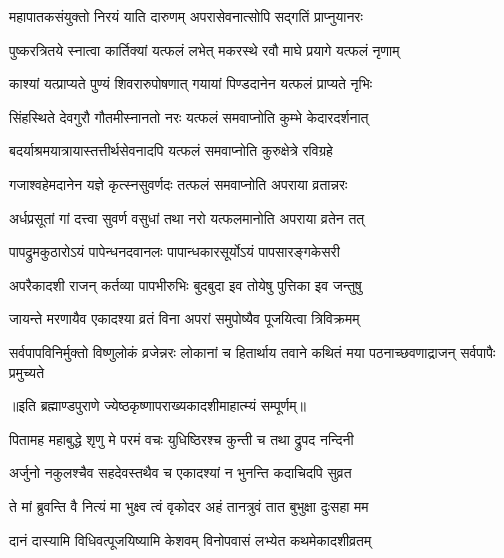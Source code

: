 \twolineshloka
{महापातकसंयुक्तो निरयं याति दारुणम्}
{अपरासेवनात्सोपि सद्गतिं प्राप्नुयानरः} %

\twolineshloka
{पुष्करत्रितये स्नात्वा कार्तिक्यां यत्फलं लभेत्}
{मकरस्थे रवौ माघे प्रयागे यत्फलं नृणाम्} %

\twolineshloka
{काश्यां यत्प्राप्यते पुण्यं शिवरारुपोषणात्}
{गयायां पिण्डदानेन यत्फलं प्राप्यते नृभिः} %

\twolineshloka
{सिंहस्थिते देवगुरौ गौतमीस्नानतो नरः}
{यत्फलं समवाप्नोति कुम्भे केदारदर्शनात्} %

\twolineshloka
{बदर्याश्रमयात्रायास्तत्तीर्थसेवनादपि}
{यत्फलं समवाप्नोति कुरुक्षेत्रे रविग्रहे} %

\twolineshloka
{गजाश्वहेमदानेन यज्ञे कृत्स्नसुवर्णदः}
{तत्फलं समवाप्नोति अपराया व्रतान्नरः} %

\twolineshloka
{अर्धप्रसूतां गां दत्त्वा सुवर्ण वसुधां तथा}
{नरो यत्फलमानोति अपराया व्रतेन तत्} %

\twolineshloka
{पापद्रुमकुठारोऽयं पापेन्धनदवानलः}
{पापान्धकारसूर्योऽयं पापसारङ्गकेसरी} %

\twolineshloka
{अपरैकादशी राजन् कर्तव्या पापभीरुभिः}
{बुदबुदा इव तोयेषु पुत्तिका इव जन्तुषु} %

\twolineshloka
{जायन्ते मरणायैव एकादश्या व्रतं विना}
{अपरां समुपोष्यैव पूजयित्वा त्रिविक्रमम्} %


\threelineshloka
{सर्वपापविनिर्मुक्तो विष्णुलोकं व्रजेन्नरः}
{लोकानां च हितार्थाय तवाने कथितं मया}
{पठनाच्छवणाद्राजन् सर्वपापैः प्रमुच्यते} %

॥इति ब्रह्माण्डपुराणे ज्येष्ठकृष्णापराख्यकादशीमाहात्म्यं सम्पूर्णम्॥


\hyperref[sec:ekadashi_mahatmyam_vrata_raja]{\closesub}
\clearpage

\label{sec:vrata-raja-jyeshtha-shukla-nirjala}


\twolineshloka
{पितामह महाबुद्धे शृणु मे परमं वचः}
{युधिष्ठिरश्च कुन्ती च तथा द्रुपद नन्दिनी} %

\twolineshloka
{अर्जुनो नकुलश्चैव सहदेवस्तथैव च}
{एकादश्यां न भुनन्ति कदाचिदपि सुव्रत} %

\twolineshloka
{ते मां ब्रुवन्ति वै नित्यं मा भुक्ष्व त्वं वृकोदर}
{अहं तानत्रुवं तात बुभुक्षा दुःसहा मम} %

\twolineshloka
{दानं दास्यामि विधिवत्पूजयिष्यामि केशवम्}
{विनोपवासं लभ्येत कथमेकादशीव्रतम्} %


